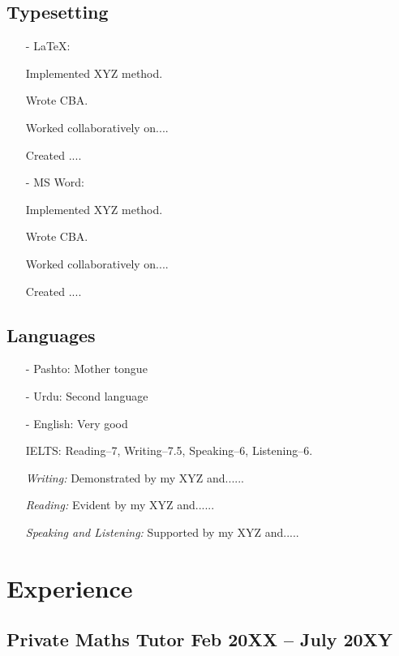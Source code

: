 \documentclass[11pt]{article}
\begin{document}
    \subsection{Typesetting}
    \begin{itemize}
        \item[-] \textcolor{Sepia}{\LaTeX}: 
        \item[\checkmark] Implemented XYZ method. 
        \item[\checkmark] Wrote CBA. 
        \item[\checkmark] Worked collaboratively on.... 
        \item[\checkmark] Created ....
        \item[-] \textcolor{Sepia}{MS Word}:  
        \item[\checkmark] Implemented XYZ method. 
        \item[\checkmark] Wrote CBA. 
        \item[\checkmark] Worked collaboratively on.... 
        \item[\checkmark] Created ....
    \end{itemize}
    \subsection{Languages}
    \begin{itemize}
        \item[-] \textcolor{Sepia}{Pashto}: Mother tongue
        \item[-] \textcolor{Sepia}{Urdu}: Second language
        \item[-] \textcolor{Sepia}{English}: Very good
            \item[\checkmark] IELTS: Reading--7, Writing--7.5, Speaking--6, Listening--6.
            \item[\checkmark] \textit{Writing:}  Demonstrated by my XYZ and......
            \item[\checkmark] \textit{Reading:}  Evident by my XYZ and......
            \item[\checkmark] \textit{Speaking and Listening:} Supported by my XYZ and.....
        \end{itemize}
    
    \section{Experience}
    \subsection{Private Maths Tutor \hfill \normalfont Feb 20XX -- July 20XY}
\end{document}
